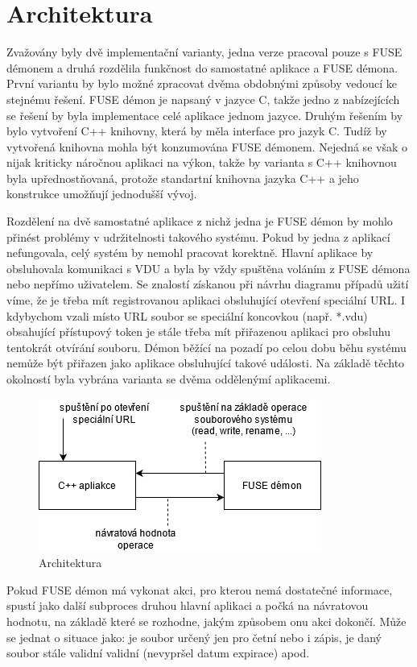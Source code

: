 \section{Architektura}

Zvažovány byly dvě implementační varianty, jedna verze pracoval pouze s FUSE démonem a druhá rozdělila funkčnost do samostatné aplikace a FUSE démona. První variantu by
bylo možné zpracovat dvěma obdobnými způsoby vedoucí ke stejnému řešení. FUSE démon je napsaný v jazyce C, takže jedno z nabízejících se řešení by byla implementace
celé aplikace jednom jazyce. Druhým řešením by bylo vytvoření C++ knihovny, která by měla interface pro jazyk C. Tudíž by vytvořená knihovna mohla být konzumována FUSE démonem.
Nejedná se však o nijak kriticky náročnou aplikaci na výkon, takže by varianta s C++ knihovnou byla upřednostňovaná, protože standartní knihovna jazyka C++ a jeho konstrukce 
umožňují jednodušší vývoj.

Rozdělení na dvě samostatné aplikace z nichž jedna je FUSE démon by mohlo přinést problémy v udržitelnosti takového systému. Pokud by jedna z aplikací nefungovala, celý systém
by nemohl pracovat korektně. Hlavní aplikace by obsluhovala komunikaci s VDU a byla by vždy spuštěna voláním z FUSE démona nebo nepřímo uživatelem. Se znalostí 
získanou při návrhu diagramu případů užití víme, že je třeba mít registrovanou aplikaci obsluhující otevření speciální URL. I kdybychom vzali místo URL soubor se speciální
koncovkou (např. *.vdu) obsahující přístupový token je stále třeba mít přiřazenou aplikaci pro obsluhu tentokrát otvírání souboru. Démon běžící na pozadí po celou dobu běhu
systému nemůže být přiřazen jako aplikace obsluhující takové události. Na základě těchto okolností byla vybrána varianta se dvěma oddělenýmí aplikacemi.

\begin{figure}[h]
    \centering
    \includegraphics[width=0.47\linewidth]{other-fig/architecture.png}
    \caption{Architektura}
\end{figure}

Pokud FUSE démon má vykonat akci, pro kterou nemá dostatečné informace, spustí jako další subproces druhou hlavní aplikaci a počká na návratovou hodnotu, na základě
které se rozhodne, jakým způsobem onu akci dokončí. Může se jednat o situace jako: je soubor určený jen pro četní nebo i zápis, je daný soubor stále validní
validní (nevypršel datum expirace) apod.

